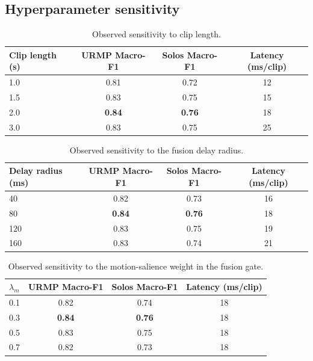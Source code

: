 \subsection{Hyperparameter sensitivity}

\begin{table}[ht]
\centering
\caption{Observed sensitivity to clip length.}
\label{tab:hyper_clip}
\begin{tabular}{lccc}
\toprule
Clip length (s) & URMP Macro-F1 & Solos Macro-F1 & Latency (ms/clip) \\
\midrule
1.0 & 0.81 & 0.72 & 12 \\
1.5 & 0.83 & 0.75 & 15 \\
2.0 & \textbf{0.84} & \textbf{0.76} & 18 \\
3.0 & 0.83 & 0.75 & 25 \\
\bottomrule
\end{tabular}
\end{table}

\begin{table}[ht]
\centering
\caption{Observed sensitivity to the fusion delay radius.}
\label{tab:hyper_delay}
\begin{tabular}{lccc}
\toprule
Delay radius (ms) & URMP Macro-F1 & Solos Macro-F1 & Latency (ms/clip) \\
\midrule
40 & 0.82 & 0.73 & 16 \\
80 & \textbf{0.84} & \textbf{0.76} & 18 \\
120 & 0.83 & 0.75 & 19 \\
160 & 0.83 & 0.74 & 21 \\
\bottomrule
\end{tabular}
\end{table}

\begin{table}[ht]
\centering
\caption{Observed sensitivity to the motion-salience weight in the fusion gate.}
\label{tab:hyper_motion}
\begin{tabular}{lccc}
\toprule
$\lambda_m$ & URMP Macro-F1 & Solos Macro-F1 & Latency (ms/clip) \\
\midrule
0.1 & 0.82 & 0.74 & 18 \\
0.3 & \textbf{0.84} & \textbf{0.76} & 18 \\
0.5 & 0.83 & 0.75 & 18 \\
0.7 & 0.82 & 0.73 & 18 \\
\bottomrule
\end{tabular}
\end{table}
